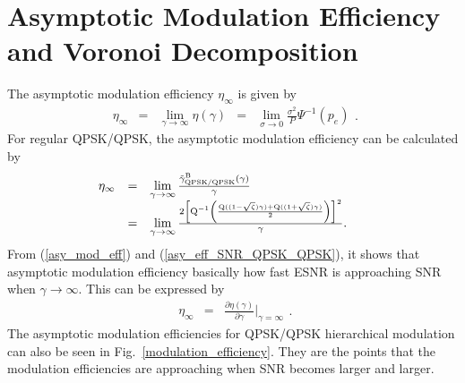 \documentclass[10pt,fleqn, twocolumn]{IEEEtran}
\begin{document}
\section{Asymptotic Modulation Efficiency and Voronoi Decomposition}
The asymptotic modulation efficiency $\eta_{\infty}$ is given by
\begin{equation}
\begin{array}{rcccl}
\eta_{\infty}&=&\lim\limits_{\gamma\rightarrow\infty}\eta\left(\gamma\right)&=&\lim\limits_{\sigma\rightarrow0}\frac{\sigma^2}{P}\Psi^{-1}\left(p_{e}\right)
\end{array}.\label{asy_mod_eff}
\end{equation}
\noindent For regular QPSK/QPSK, the asymptotic modulation
efficiency can be calculated by
\begin{equation}\hspace{-0.225in}
\begin{array}{rcl}
\eta_{\infty}&=&\lim\limits_{\gamma\rightarrow\infty}\frac{\tilde{\gamma}_{\mbox{\tiny
QPSK/QPSK}}^{\rm
B}(\gamma)}{\gamma}\\
&=&\lim\limits_{\gamma\rightarrow\infty}\frac{2\left[{\rm
Q}^{-1}\left(\frac{{\rm Q}((1-\sqrt{\zeta})\gamma)+{\rm
Q}((1+\sqrt{\zeta})\gamma)}{2}\right)\right]^2}{\gamma}.
\end{array}\label{asy_eff_SNR_QPSK_QPSK}
\end{equation}
\noindent From (\ref{asy_mod_eff}) and
(\ref{asy_eff_SNR_QPSK_QPSK}), it shows that asymptotic modulation
efficiency basically how fast ESNR is approaching SNR when
$\gamma\rightarrow\infty$. This can be expressed by
\begin{equation}
\begin{array}{rcl}
\eta_{\infty}&=&\frac{\partial\eta\left(\gamma\right)}{\partial\gamma}|_{\gamma=\infty}
\end{array}.\label{asy_mod_eff2}
\end{equation}
\noindent The asymptotic modulation efficiencies for QPSK/QPSK
hierarchical modulation can also be seen in
Fig.~\ref{modulation_efficiency}. They are the points that the
modulation efficiencies are approaching when SNR becomes larger
and larger.
\end{document}
